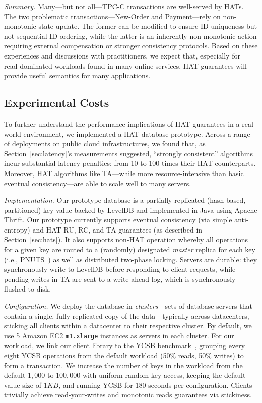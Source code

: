 \vspace{.5em}\noindent\textit{Summary.} Many---but not all---TPC-C transactions are well-served by
HATs. The two problematic transactions---New-Order and Payment---rely
on non-monotonic state update. The former can be modified to ensure ID
uniqueness but not sequential ID ordering, while the latter is an
inherently non-monotonic action requiring external compensation or
stronger consistency protocols. Based on these experiences and
discussions with practitioners, we expect that, especially for
read-dominated workloads found in many online services, HAT guarantees
will provide useful semantics for many applications.

\subsection{Experimental Costs}
\label{sec:prototype}

To further understand the performance implications of HAT guarantees
in a real-world environment, we implemented a HAT database
prototype. Across a range of deployments on public cloud
infrastructures, we found that, as Section~\ref{sec:latency}'s
measurements suggested, ``strongly consistent'' algorithms incur
substantial latency penalties: from 10 to 100 times their HAT
counterparts. Moreover, HAT algorithms like TA---while more
resource-intensive than basic eventual consistency---are able to scale
well to many servers.

\vspace{.5em}\noindent\textit{Implementation.} Our prototype database
is a partially replicated (hash-based, partitioned) key-value backed
by LevelDB and implemented in Java using Apache Thrift. Our prototype
currently supports eventual consistency (via simple anti-entropy) and
HAT RU, RC, and TA guarantees (as described in
Section~\ref{sec:hats}). It also supports non-HAT operation whereby
all operations for a given key are routed to a (randomly) designated
\textit{master} replica for each key (i.e., PNUTS~\cite{pnuts}) as
well as distributed two-phase locking. Servers are durable: they
synchronously write to LevelDB before responding to client requests,
while pending writes in TA are sent to a write-ahead log, which is
synchronously flushed to disk.

\vspace{.5em}\noindent\textit{Configuration.} We deploy the database
in \textit{clusters}---sets of database servers that contain a single,
fully replicated copy of the data---typically across datacenters,
sticking all clients within a datacenter to their respective
cluster. By default, we use 5 Amazon EC2 \texttt{m1.xlarge} instances
as servers in each cluster. For our workload, we link our client
library to the YCSB benchmark~\cite{ycsb}, grouping every eight YCSB
operations from the default workload (50\% reads, 50\% writes) to form
a transaction. We increase the number of keys in the workload from the
default $1,000$ to $100,000$ with uniform random key access, keeping
the default value size of $1KB$, and running YCSB for 180 seconds per
configuration. Clients trivially achieve read-your-writes and
monotonic reads guarantees via stickiness.

